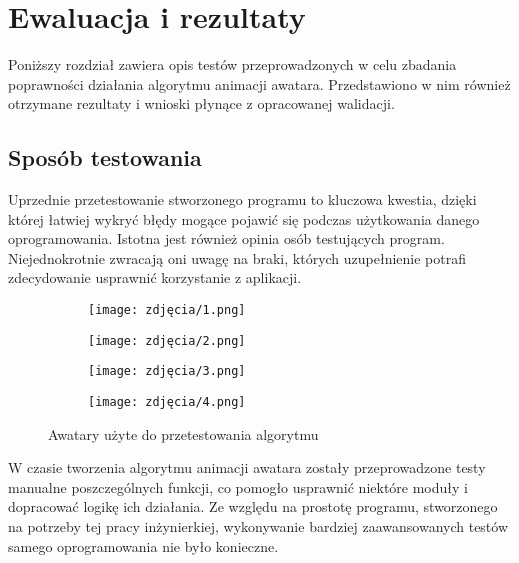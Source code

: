 \chapter{Ewaluacja i rezultaty}
\label{cha:ewaluacjaIRezultaty}
Poniższy rozdział zawiera opis testów przeprowadzonych w celu zbadania poprawności działania algorytmu animacji awatara. Przedstawiono w nim również otrzymane rezultaty i wnioski płynące z opracowanej walidacji.


\section{Sposób testowania}
Uprzednie przetestowanie stworzonego programu to kluczowa kwestia, dzięki której łatwiej wykryć błędy mogące pojawić się podczas użytkowania danego oprogramowania. Istotna jest również opinia osób testujących program. Niejednokrotnie zwracają oni uwagę na braki, których uzupełnienie potrafi zdecydowanie usprawnić korzystanie z aplikacji.

\begin{figure}[h]
	\centering
	\begin{subfigure}{0.35\textwidth}
		\centering
		\texttt{[image: zdjęcia/1.png]}
		\subcaption{\label{avatar_1}}
	\end{subfigure}
	\begin{subfigure}{0.35\textwidth}
		\centering
		\texttt{[image: zdjęcia/2.png]}
		\subcaption{\label{avatar_2}}
	\end{subfigure}
	\begin{subfigure}{0.35\textwidth}
		\centering
		\texttt{[image: zdjęcia/3.png]}
		\subcaption{\label{avatar_3}}
	\end{subfigure}
	\begin{subfigure}{0.35\textwidth}
		\centering
		\texttt{[image: zdjęcia/4.png]}
		\subcaption{\label{avatar_4}}
	\end{subfigure}
	
	\caption{\label{fig:avatars}Awatary użyte do przetestowania algorytmu}
\end{figure}

W czasie tworzenia algorytmu animacji awatara zostały przeprowadzone testy manualne poszczególnych funkcji, co pomogło usprawnić niektóre moduły i dopracować logikę ich działania. Ze względu na prostotę programu, stworzonego na potrzeby tej pracy inżynierkiej, wykonywanie bardziej zaawansowanych testów samego oprogramowania nie było konieczne.

